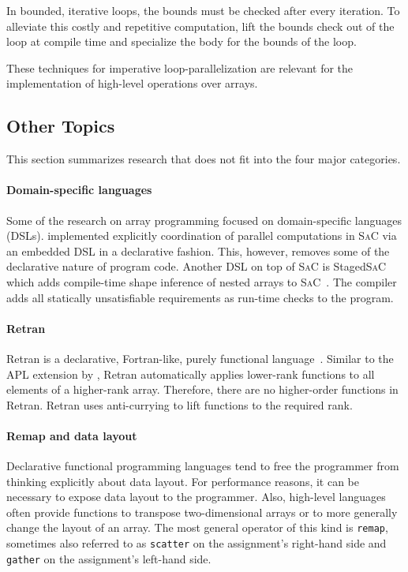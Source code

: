 \documentclass[a4paper]{article}
\newcommand{\sac}{S\textsc{a}C}
\begin{document}
In bounded, iterative loops, the bounds must be checked after every
iteration. To alleviate this costly and repetitive computation,
\citet{Henriksen:2014:BCI:2627373.2627388} lift the bounds check out
of the loop at compile time and specialize the body for the bounds of
the loop.

These techniques for imperative loop-parallelization are relevant for
the implementation of high-level operations over arrays.

\subsection{Other Topics}
\label{sec:other-topics}

This section summarizes research that does not fit into the four major
categories.

\paragraph{Domain-specific languages}

Some of the research on array programming focused on domain-specific
languages (DSLs). \citet{4228136} implemented explicitly coordination
of parallel computations in \sac{} via an embedded DSL in a
declarative fashion. This, however, removes some of the declarative
nature of program code. Another DSL on top of \sac{} is Staged\sac{}
which adds compile-time shape inference of nested arrays to
\sac{}~\cite{Ureche:2012:SCS:2103746.2103762}. The compiler adds all
statically unsatisfiable requirements as run-time checks to the
program.

\paragraph{Retran}

Retran is a declarative, Fortran-like, purely functional
language~\cite{367042}. Similar to the APL extension by
\citet{Lowney:1981:CAI:567532.567533}, Retran automatically applies
lower-rank functions to all elements of a higher-rank
array. Therefore, there are no higher-order functions in
Retran. Retran uses anti-currying to lift functions to the required
rank.

\paragraph{Remap and data layout}

Declarative functional programming languages tend to free the
programmer from thinking explicitly about data layout. For performance
reasons, it can be necessary to expose data layout to the
programmer. Also, high-level languages often provide functions to
transpose two-dimensional arrays or to more generally change the
layout of an array. The most general operator of this kind is
\texttt{remap}, sometimes also referred to as \texttt{scatter} on the
assignment's right-hand side and \texttt{gather} on the assignment's
left-hand side.
\end{document}
